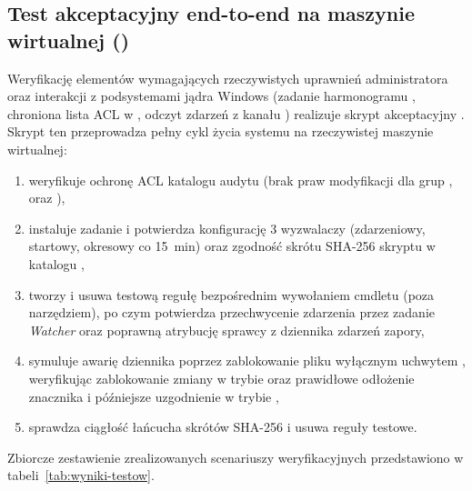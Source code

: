 \subsection{Test akceptacyjny end-to-end na maszynie wirtualnej ()}\label{subsec:testy-akceptacyjne}

Weryfikację elementów wymagających rzeczywistych uprawnień administratora oraz interakcji z podsystemami jądra Windows (zadanie harmonogramu , chroniona lista ACL w , odczyt zdarzeń z kanału ) realizuje skrypt akceptacyjny . Skrypt ten przeprowadza pełny cykl życia systemu na rzeczywistej maszynie wirtualnej:
\begin{enumerate}
    \item weryfikuje ochronę ACL katalogu audytu (brak praw modyfikacji dla grup ,  oraz ),
    \item instaluje zadanie \code{\FirewallAudit\Watcher} i potwierdza konfigurację 3 wyzwalaczy (zdarzeniowy, startowy, okresowy co 15~min) oraz zgodność skrótu SHA-256 skryptu w katalogu ,
    \item tworzy i usuwa testową regułę  bezpośrednim wywołaniem cmdletu  (poza narzędziem), po czym potwierdza przechwycenie zdarzenia przez zadanie \textit{Watcher} oraz poprawną atrybucję sprawcy z dziennika zdarzeń zapory,
    \item symuluje awarię dziennika poprzez zablokowanie pliku  wyłącznym uchwytem , weryfikując zablokowanie zmiany w trybie  oraz prawidłowe odłożenie znacznika i późniejsze uzgodnienie w trybie ,
    \item sprawdza ciągłość łańcucha skrótów SHA-256 i usuwa reguły testowe.
\end{enumerate}

Zbiorcze zestawienie zrealizowanych scenariuszy weryfikacyjnych przedstawiono w tabeli~\ref{tab:wyniki-testow}.

